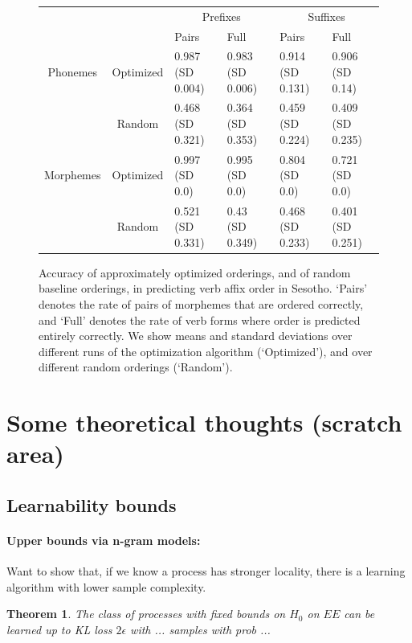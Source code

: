 \documentclass[11pt,letterpaper]{article}
\newcounter{theorem}
\newtheorem{thm}[theorem]{Theorem}
\begin{document}
\begin{figure}
\begin{tabular}{cc||ll|ll}
             &              & \multicolumn{2}{c}{Prefixes}    & \multicolumn{2}{|c}{Suffixes} \\
             &              & Pairs & Full & Pairs & Full \\ \hline\hline
             Phonemes   &   Optimized  &  0.987 (SD 0.004) & 0.983 (SD 0.006) & 0.914 (SD 0.131) & 0.906 (SD 0.14) \\
           &   Random  &  0.468 (SD 0.321) & 0.364 (SD 0.353) & 0.459 (SD 0.224) & 0.409 (SD 0.235) \\ \hline
Morphemes  &   Optimized  &  0.997 (SD 0.0) & 0.995 (SD 0.0) & 0.804 (SD 0.0) & 0.721 (SD 0.0) \\
           &   Random  &  0.521 (SD 0.331) & 0.43 (SD 0.349) & 0.468 (SD 0.233) & 0.401 (SD 0.251) \\
\end{tabular}
\caption{Accuracy of approximately optimized orderings, and of random baseline orderings, in predicting verb affix order in Sesotho. `Pairs' denotes the rate of pairs of morphemes that are ordered correctly, and `Full' denotes the rate of verb forms where order is predicted entirely correctly. We show means and standard deviations over different runs of the optimization algorithm (`Optimized'), and over different random orderings (`Random').}\label{fig:acc-sesotho}
\end{figure}

\section{Some theoretical thoughts (scratch area)}
\subsection{Learnability bounds}

\paragraph{Upper bounds via n-gram models:}
Want to show that, if we know a process has stronger locality, there is a learning algorithm with lower sample complexity.

\begin{thm}
The class of processes with fixed bounds on $H_0$ on $EE$ can be learned up to KL loss $2\epsilon$ with ... samples with prob ...
\end{thm}
\end{document}
